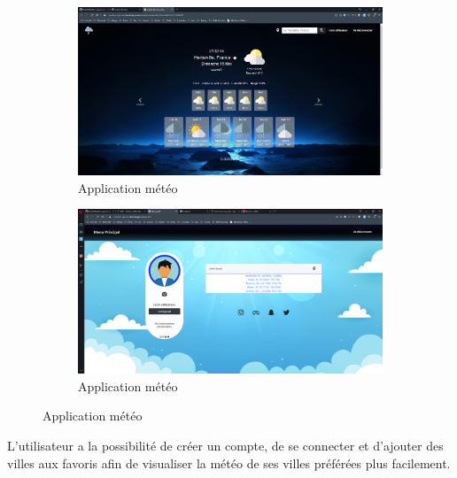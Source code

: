 \documentclass[12pt, french]{article}
\begin{document}
		\begin{figure}[htbp]
		    \centering
    		\begin{subfigure}{.7\textwidth}
    		    \centering
                \includegraphics[width=\linewidth]{images/app_meteo.PNG}
                \caption{Application météo}
                \label{fig:Application_météo}
            \end{subfigure}
            \begin{subfigure}{.7\textwidth}
    		    \centering
                \includegraphics[width=\linewidth]{images/app_meteo_profile.PNG}
                \caption{Application météo}
                \label{fig:Application_météo}
            \end{subfigure}
            \caption{Application météo}
            \label{fig:Application_météo}
        \end{figure}
        
        \begin{center}
        L’utilisateur a la possibilité de créer un compte, de se connecter et d'ajouter des villes aux favoris afin de visualiser la météo de ses villes préférées plus facilement.
        \end{center}
\end{document}
